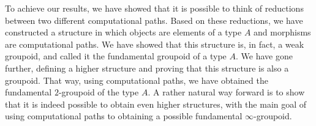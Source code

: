\documentclass[12pt, a4paper,  oneside, headinclude,footinclude, BCOR5mm]{scrartcl}
\begin{document}
To achieve our results, we have showed that it is possible to think of reductions between two different computational paths. Based on these reductions, we have constructed a structure in which objects are elements of a type $A$ and morphisms are computational paths. We have showed that this structure is, in fact, a weak groupoid, and called it the fundamental groupoid of a type $A$. We have gone further, defining a higher structure and proving that this structure is also a groupoid. That way, using computational paths, we have obtained the fundamental $2$-groupoid of the type $A$. A rather natural way forward is to show that it is indeed possible to obtain even higher structures, with the main goal of using computational paths to obtaining a possible fundamental $\infty$-groupoid.



\end{document}
